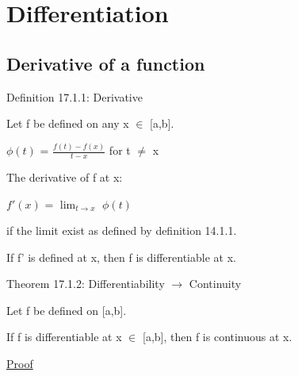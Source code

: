 \newpage

\section[Day 17: Differentiation]{Differentiation}

\subsection{ Derivative of a function }

{ \color{blue} Definition 17.1.1: Derivative }

    \begin{adjustbox}{minipage=14cm, right, vspace=0.1cm 0cm}
        Let f be defined on any x $\in$ [a,b].

        \hspace{1cm}
        $\phi(t)$ = $\frac{f(t) - f(x)}{t - x}$ for t $\not =$ x
        
        The derivative of f at x:

        \hspace{1cm}
        $f'(x)$ = $\lim_{t \rightarrow x}$ $\phi(t)$

        if the limit exist as defined by {\color{blue} definition 14.1.1}.

        If f' is defined at x, then f is differentiable at x.
    \end{adjustbox}

    \vspace{0.5cm}

{ \color{red} Theorem 17.1.2: Differentiability $\rightarrow$ Continuity }

    \begin{adjustbox}{minipage=14cm, right, vspace=0.1cm 0cm}
        Let f be defined on [a,b].
        
        If f is differentiable at x $\in$ [a,b], then f is continuous at x.
    \end{adjustbox}

{ \color{magenta} \underline{Proof} }


    \vspace{0.5cm}

